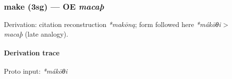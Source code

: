\documentclass[
  british,
  a4paper,
]{article}
\begin{document}
\subsubsection{\texorpdfstring{make (3sg) --- OE
\emph{macaþ}}{make (3sg) --- OE macaþ}}\label{make-3sg-oe-macauxfe}

Derivation: citation reconstruction \emph{*makōną}; form followed here
\emph{*mákōθi} \textgreater{} \emph{macaþ} (late analogy).

\paragraph{Derivation trace}\label{derivation-trace-141}

Proto input: \emph{*mákōθi}

\begingroup
\setlength{\fboxsep}{6pt}
\end{document}
